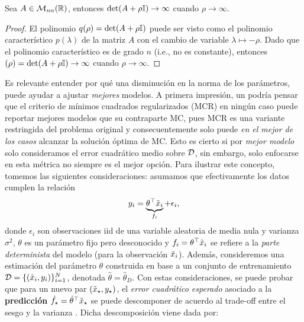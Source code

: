 \begin{lemma}
	Sea $A\in\mathcal{M}_{nn}(\mathbb{R})$, entonces $\det(A+\rho{\mathbb I})\to \infty$ cuando $\rho\to\infty$.
\end{lemma}

\begin{proof}
	El polinomio $q(\rho)=\det(A+\rho{\mathbb I})$ puede ser visto como el polinomio característico $p(\lambda)$ de la matriz $A$ con el cambio de variable $\lambda\mapsto -\rho$. Dado que el polinomio característico es de grado $n$ (i.e., no es constante), entonces $(\rho)=\det(A+\rho{\mathbb I})\to\infty$ cuando $\rho\to\infty$.
\end{proof}

Es relevante entender por qué una disminución en la norma de los parámetros, puede ayudar a ajustar \emph{mejores} modelos. A primera impresión, un podría pensar que el criterio de mínimos cuadrados regularizados (MCR) en ningún caso puede reportar mejores modelos que su contraparte MC, pues MCR es una variante restringida del problema original y consecuentemente solo puede \emph{en el mejor de los casos} alcanzar la solución óptima de MC. Esto es cierto si por \emph{mejor modelo} solo consideramos el error cuadrático medio sobre ${\mathcal D}$, sin embargo, solo enfocarse en esta métrica no siempre es el mejor opción. Para ilustrar este concepto, tomemos las siguientes consideraciones: asumamos que efectivamente los datos cumplen la relación
\begin{equation}
	y_i = \underbrace{\theta^\top\tilde{x}_i}_{f_i} + \epsilon_i,	
 \end{equation}
 donde $\epsilon_i$ son observaciones iid de una variable aleatoria de media nula y varianza $\sigma^2$, $\theta$ es un parámetro fijo pero desconocido y $f_i= \theta^\top\tilde{x}_i$ se refiere a la  \emph{parte determinista} del modelo (para la observación $\tilde{x}_i$). Además, consideremos una estimación del parámetro $\theta$ construida en base a un conjunto de entrenamiento ${\mathcal D}=\{(\tilde{x}_i,y_i)\}_{i=1}^N$, denotada $\hat\theta=\hat\theta_D$. Con estas consideraciones, se puede probar que para un nuevo par $(\tilde{x}_\star,y_\star)$, el \emph{error cuadrático esperado} asociado a la \textbf{predicción} $\hat f_\star = \hat\theta^\top \tilde{x}_\star$ se puede descomponer de acuerdo al trade-off entre el sesgo y la varianza \cite{ISLbook}. Dicha descomposición viene dada por:
 
